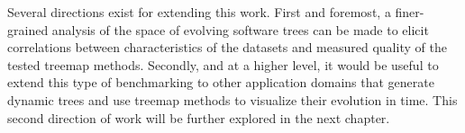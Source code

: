 Several directions exist for extending this work. First and foremost, a finer-grained analysis of the space of evolving software trees can be made to elicit correlations between characteristics of the datasets and measured quality of the tested treemap methods. Secondly, and at a higher level, it would be useful to extend this type of benchmarking to other application domains that generate dynamic trees and use treemap methods to visualize their evolution in time. This second direction of work will be further explored in the next chapter.

